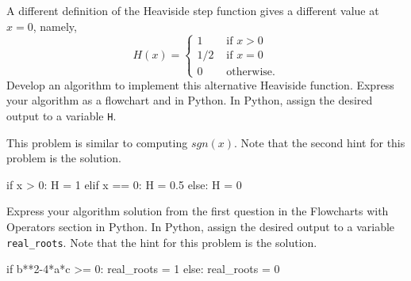 \documentclass{ximera}
\begin{document}
\begin{question}
A different definition of the Heaviside step function gives a different value at $x=0$, namely,
	$$H(x)=\begin{cases} 1 &\text{ if $x>0$}\\
		1/2 &\text{ if $x=0$}\\
		0 &\text{ otherwise.}
	\end{cases}$$
Develop an algorithm to implement this alternative Heaviside function. Express your algorithm as a flowchart and in Python. In Python, assign the desired output to a variable \verb|H|.
	\begin{hint}
		This problem is similar to computing $sgn(x)$. Note that the second hint for this problem is the solution.
	\end{hint}
	\begin{hint}
	\begin{center}
	\end{center}
\begin{sageCell}
if x > 0:
        H = 1
elif x == 0:
        H = 0.5
else:
        H = 0
\end{sageCell}
	\end{hint}
\end{question}

\begin{question}
	Express your algorithm solution from the first question in the Flowcharts with Operators section in Python. In Python, assign the desired output to a variable \verb|real_roots|.  Note that the hint for this problem is the solution.
	\begin{hint}
\begin{sageCell}
if b**2-4*a*c >= 0:
	real_roots = 1
else:
	real_roots = 0
\end{sageCell}
	\end{hint}
\end{question}
\end{document}

